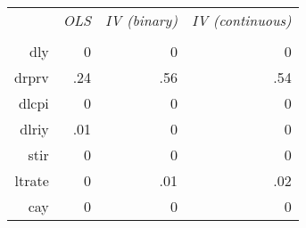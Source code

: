 \begin{tabular}{rrrr}
\textit{}&\textit{OLS}&\textit{IV (binary)}&\textit{IV (continuous)}\\\\
dly&0&0&0\\
drprv&.24&.56&.54\\
dlcpi&0&0&0\\
dlriy&.01&0&0\\
stir&0&0&0\\
ltrate&0&.01&.02\\
cay&0&0&0\\
\end{tabular}

